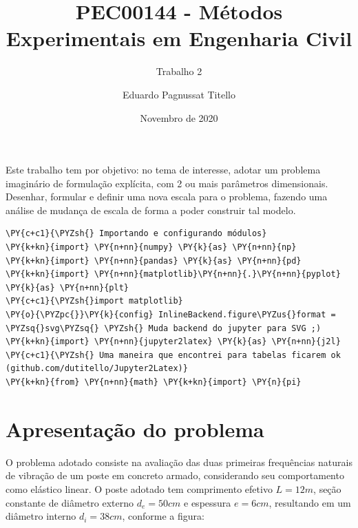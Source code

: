 

\author{Eduardo Pagnussat Titello}
\title{PEC00144 - Métodos Experimentais em Engenharia Civil}
\subtitle{Trabalho 2}
\date{Novembro de 2020}




\maketitle


Este trabalho tem por objetivo: no tema de interesse, adotar um problema
imaginário de formulação explícita, com 2 ou mais parâmetros
dimensionais. Desenhar, formular e definir uma nova escala para o
problema, fazendo uma análise de mudança de escala de forma a poder
construir tal modelo.

    \begin{tcolorbox}[breakable, size=fbox, boxrule=1pt, pad at break*=1mm,colback=cellbackground, colframe=cellborder]
\begin{Verbatim}[commandchars=\\\{\}]
\PY{c+c1}{\PYZsh{} Importando e configurando módulos}
\PY{k+kn}{import} \PY{n+nn}{numpy} \PY{k}{as} \PY{n+nn}{np}
\PY{k+kn}{import} \PY{n+nn}{pandas} \PY{k}{as} \PY{n+nn}{pd} 
\PY{k+kn}{import} \PY{n+nn}{matplotlib}\PY{n+nn}{.}\PY{n+nn}{pyplot} \PY{k}{as} \PY{n+nn}{plt}
\PY{c+c1}{\PYZsh{}import matplotlib}
\PY{o}{\PYZpc{}}\PY{k}{config} InlineBackend.figure\PYZus{}format = \PYZsq{}svg\PYZsq{} \PYZsh{} Muda backend do jupyter para SVG ;)
\PY{k+kn}{import} \PY{n+nn}{jupyter2latex} \PY{k}{as} \PY{n+nn}{j2l} \PY{c+c1}{\PYZsh{} Uma maneira que encontrei para tabelas ficarem ok (github.com/dutitello/Jupyter2Latex)}
\PY{k+kn}{from} \PY{n+nn}{math} \PY{k+kn}{import} \PY{n}{pi}
\end{Verbatim}
\end{tcolorbox}

    \hypertarget{apresentauxe7uxe3o-do-problema}{%
\section{Apresentação do
problema}\label{apresentauxe7uxe3o-do-problema}}

O problema adotado consiste na avaliação das duas primeiras frequências
naturais de vibração de um poste em concreto armado, considerando seu
comportamento como elástico linear. O poste adotado tem comprimento
efetivo \(L= 12m\), seção constante de diâmetro externo \(d_e = 50cm\) e
espessura \(e=6 cm\), resultando em um diâmetro interno \(d_i = 38cm\),
conforme a figura:

